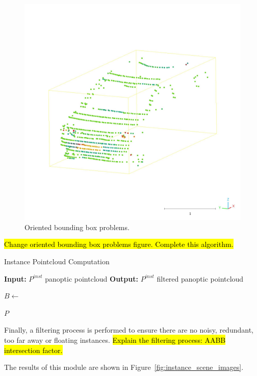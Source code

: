 \begin{figure}[h!]
    \centering
    \includegraphics[width=0.5\linewidth]{images/methodology/oriendet_bbox_problem_aux.jpeg}
    \caption{Oriented bounding box problems.}
    \label{fig:oriented_bounding_box_problems}
\end{figure}

\hl{Change oriented bounding box problems figure. Complete this algorithm.}
\begin{algorithm}
    \caption{Instance Pointcloud Computation}
    \label{algorithm:instance_pointcloud}
    \footnotesize

    \begin{algorithmic}[1]
        \State \textbf{Input:} $P^{inst}$ panoptic pointcloud
        \State \textbf{Output:} $P^{inst}$ filtered panoptic pointcloud
        
                \State $B \gets $
            
            \EndFor
        \EndFor
        
        \State \Return $P$
    \end{algorithmic}
\end{algorithm}

Finally, a filtering process is performed to ensure there are no noisy, redundant, too far away or floating instances.
\hl{Explain the filtering process: AABB intersection factor.}

The results of this module are shown in Figure~\ref{fig:instance_scene_images}.

